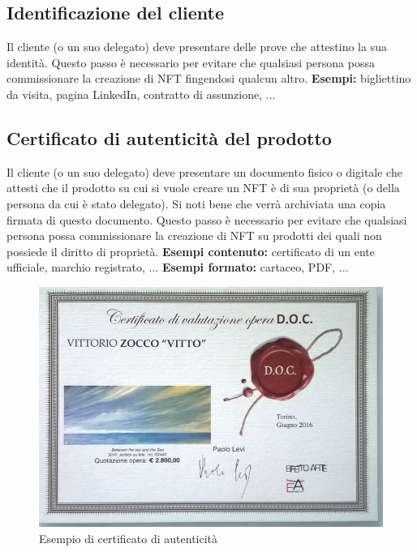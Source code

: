 \documentclass[12pt]{report}
\begin{document}
\subsection{Identificazione del cliente}
Il cliente (o un suo delegato) deve presentare delle prove che attestino la sua identità.\newline
Questo passo è necessario per evitare che qualsiasi persona possa commissionare la creazione di NFT fingendosi qualcun altro.\newline
\textbf{Esempi:} bigliettino da visita, pagina LinkedIn, contratto di assunzione, ...\newpage
\subsection{Certificato di autenticità del prodotto}
Il cliente (o un suo delegato) deve presentare un documento fisico o digitale che attesti che il prodotto su cui si vuole creare un NFT è di sua proprietà (o della persona da cui è stato delegato). Si noti bene che verrà archiviata una copia firmata di questo documento.\newline
Questo passo è necessario per evitare che qualsiasi persona possa commissionare la creazione di NFT su prodotti dei quali non possiede il diritto di proprietà.\newline
\textbf{Esempi contenuto:} certificato di un ente ufficiale, marchio registrato, ...\newline
\textbf{Esempi formato:} cartaceo, PDF, ...
\begin{figure}[H]
    \centering
    \includegraphics[width=1\textwidth]{Certificate.jpeg}
    \captionsetup{justification=centering}
    \caption{Esempio di certificato di autenticità \cite{Quindici}}
    \label{fig:certificato}
\end{figure}
\end{document}

